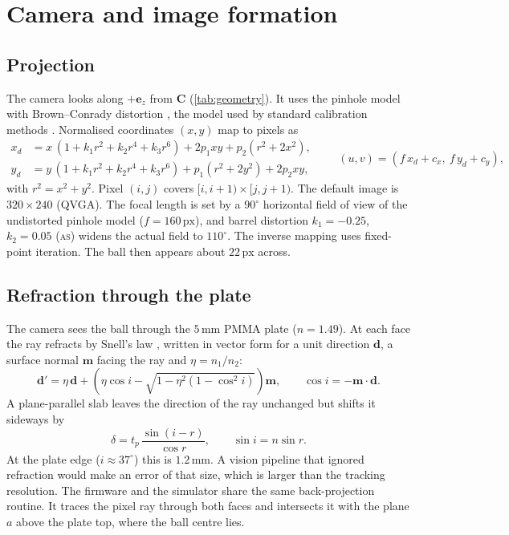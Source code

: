 \documentclass[10pt,a4paper]{article}
\newcommand{\un}[1]{\,\mathrm{#1}}
\newcommand{\vect}[1]{\bm{#1}}
\newcommand{\tagAS}{\textsc{as}}
\begin{document}
\section{Camera and image formation}\label{sec:camera}
\subsection{Projection}
The camera looks along $+\vect e_z$ from $\vect C$ (\cref{tab:geometry}). It uses the pinhole
model \citep{hartley2004multiple} with Brown--Conrady distortion
\citep{brown1966decentering}, the model used by standard calibration methods
\citep{zhang2000flexible}. Normalised coordinates $(x,y)$ map to pixels as
\begin{equation}
\begin{aligned}
  x_d&=x\,(1+k_1r^2+k_2r^4+k_3r^6)+2p_1xy+p_2(r^2+2x^2),\\
  y_d&=y\,(1+k_1r^2+k_2r^4+k_3r^6)+p_1(r^2+2y^2)+2p_2xy,
\end{aligned}
\qquad (u,v)=(f\,x_d+c_x,\ f\,y_d+c_y),
\end{equation}
with $r^2=x^2+y^2$. Pixel $(i,j)$ covers $[i,i+1)\times[j,j+1)$. The default image is
$320\times240$ (QVGA). The focal length is set by a $90^\circ$ horizontal field of view of the
undistorted pinhole model ($f=160\un{px}$), and barrel distortion $k_1=-0.25$, $k_2=0.05$
(\tagAS) widens the actual field to $110^\circ$. The inverse mapping uses fixed-point iteration.
The ball then appears about $22\un{px}$ across.

\subsection{Refraction through the plate}
The camera sees the ball through the $5\un{mm}$ PMMA plate ($n=1.49$). At each face the ray
refracts by Snell's law \citep{hecht2017optics}, written in vector form for a unit direction
$\vect d$, a surface normal $\vect m$ facing the ray and $\eta=n_1/n_2$:
\begin{equation}
  \vect d'=\eta\,\vect d+\left(\eta\cos i-\sqrt{1-\eta^2(1-\cos^2i)}\right)\vect m,\qquad\cos i=-\vect m\cdot\vect d.
\end{equation}
A plane-parallel slab leaves the direction of the ray unchanged but shifts it sideways by
\begin{equation}
  \delta=t_p\,\frac{\sin(i-r)}{\cos r},\qquad \sin i=n\sin r .
\end{equation}
At the plate edge ($i\approx37^\circ$) this is $1.2\un{mm}$. A vision pipeline that ignored
refraction would make an error of that size, which is larger than the tracking resolution. The
firmware and the simulator share the same back-projection routine. It traces the pixel ray
through both faces and intersects it with the plane $a$ above the plate top, where the ball
centre lies.
\end{document}
